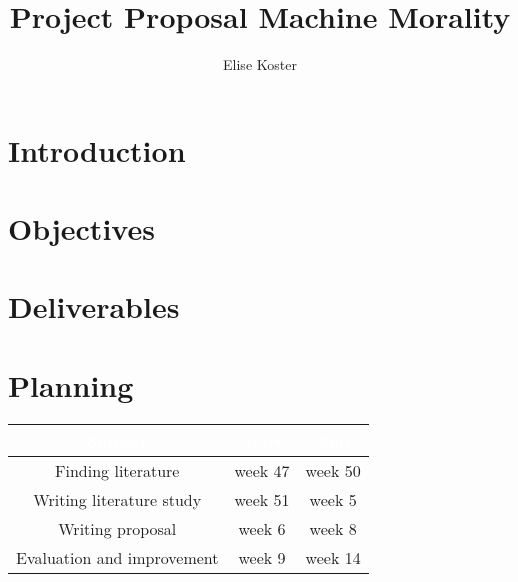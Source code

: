 \documentclass[12pt,a4paper]{amsart}
\title{Project Proposal Machine Morality}
\author{Elise Koster}
\date{}
\begin{document}
\maketitle

\section{Introduction}

\section{Objectives}

\section{Deliverables}

\section{Planning}

\begin{tabular}{ |c | c | c|}
\rowcolor{dark-gray}
\hline
\textcolor{white}{\textbf{Subject}} & \textcolor{white}{\textbf{Start}} & \textcolor{white}{\textbf{End}}\\
	\hline
	Finding literature & week 47 & week 50 \\
	\hline
	Writing literature study & week 51 & week  5\\
	\hline
	Writing proposal & week 6 & week 8 \\
	\hline
	Evaluation and improvement & week 9 & week 14 \\
	\hline
\end{tabular}\\



\end{document}
